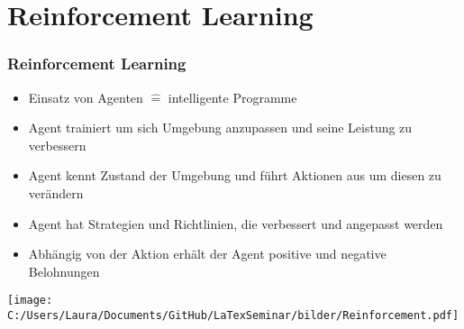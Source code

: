\documentclass[11pt]{beamer}
\begin{document}
%	
	
	\section{Reinforcement Learning}
	
	\begin{frame}
		\frametitle{Reinforcement Learning}
		\begin{itemize}
			\item Einsatz von Agenten $\widehat{=}$ intelligente Programme
			\item Agent trainiert um sich Umgebung anzupassen und seine Leistung zu verbessern
			\item Agent kennt Zustand der Umgebung und führt Aktionen aus um diesen zu verändern
			\item Agent hat Strategien und Richtlinien, die verbessert und angepasst werden
			\item Abhängig von der Aktion erhält der Agent positive und negative Belohnungen
		\end{itemize}
		\centering
		\texttt{[image: C:/Users/Laura/Documents/GitHub/LaTexSeminar/bilder/Reinforcement.pdf]}
	\end{frame}
	
\end{document}
